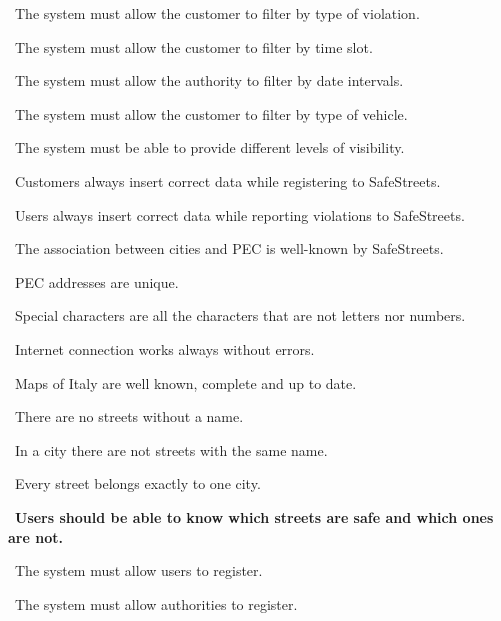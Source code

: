 \begin{description}
\begin{description}
\begin{description}
							\item {}\ The system must allow the customer to filter by type of violation.
							\item {}\ The system must allow the customer to filter by time slot.
							\item {}\ The system must allow the authority to filter by date intervals.
							\item {}\ The system must allow the customer to filter by type of vehicle.
							\item {}\ The system must be able to provide different levels of visibility.
							\item {}\ Customers always insert correct data while registering to SafeStreets.
							\item {}\ Users always insert correct data while reporting violations to SafeStreets.
							\item {}\ The association between cities and PEC is well-known by SafeStreets.
							\item {}\ PEC addresses are unique.
							\item {}\ Special characters are all the characters that are not letters nor numbers.
							\item {}\ Internet connection works always without errors.
							\item {}\ Maps of Italy are well known, complete and up to date.
							\item {}\ There are no streets without a name.
							\item {}\ In a city there are not streets with the same name.
							\item {}\ Every street belongs exactly to one city.
						\end{description}
				\end{description}
			\item {}\ \textbf{Users should be able to know which streets are safe and which ones are not.} 
				\begin{description}
					\item {}\ The system must allow users to register.
					\item {}\ The system must allow authorities to register.

\end{description}
\end{description}
